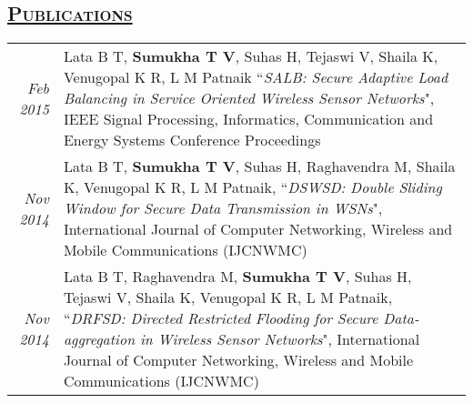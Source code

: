 \documentclass[14pt]{article}
\begin{document}
\subsection* {\scshape\LARGE\uline {Publications}}
\begin{tabularx}{\textwidth}{r X}
\emph{Feb 2015} & Lata B T, \textbf{Sumukha T V}, Suhas H, Tejaswi V, Shaila K, Venugopal K R, L M Patnaik ``\emph {SALB: Secure Adaptive Load 		         Balancing in Service Oriented Wireless Sensor Networks}",  IEEE Signal Processing, Informatics, Communication and Energy Systems Conference Proceedings \\
\emph{Nov 2014} & Lata B T, \textbf{Sumukha T V}, Suhas H, Raghavendra M, Shaila K, Venugopal K R, L M Patnaik, ``\emph{DSWSD: Double Sliding Window for Secure Data Transmission in WSNs}", International Journal of Computer Networking, Wireless and Mobile Communications (IJCNWMC) \\
\emph{Nov 2014} & Lata B T, Raghavendra M,  \textbf{Sumukha T V}, Suhas H, Tejaswi V, Shaila K, Venugopal K R, L M Patnaik, ``\emph{DRFSD: Directed Restricted Flooding for Secure Data-aggregation in Wireless Sensor Networks}", International Journal of Computer Networking, Wireless and Mobile Communications (IJCNWMC)
\end{tabularx}
\end{document}
